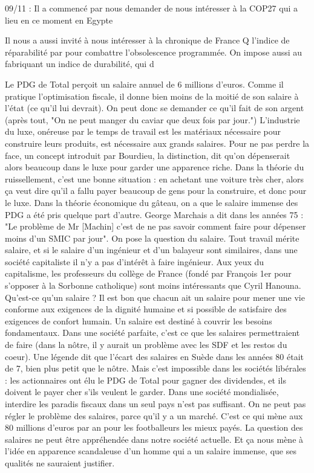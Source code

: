 \documentclass[a4paper,12pt]{book}
\begin{document}
\par 09/11 : Il a commencé par nous demander de nous intéresser à la COP27 qui a lieu en ce moment en Egypte
\par Il nous a aussi invité à nous intéresser à la chronique de France Q l'indice de réparabilité par pour combattre l'obsolescence programmée. On impose aussi au fabriquant un indice de durabilité, qui d
\par Le PDG de Total perçoit un salaire annuel de 6 millions d'euros. Comme il pratique l'optimisation fiscale, il donne bien moins de la moitié de son salaire à l'état (ce qu'il lui devrait). On peut donc se demander ce qu'il fait de son argent (après tout, "On ne peut manger du caviar que deux fois par jour.") L'industrie du luxe, onéreuse par le temps de travail est les matériaux nécessaire pour construire leurs produits, est nécessaire aux grands salaires. Pour ne pas perdre la face, un concept introduit par Bourdieu, la distinction, dit qu'on dépenserait alors beaucoup dans le luxe pour garder une apparence riche. Dans la théorie du ruissellement, c'est une bonne situation : en achetant une voiture très cher, alors ça veut dire qu'il a fallu payer beaucoup de gens pour la construire, et donc pour le luxe. Dans la théorie économique du gâteau, on a que le salaire immense des PDG a été pris quelque part d'autre. George Marchais a dit dans les années 75 : "Le problème de Mr [Machin] c'est de ne pas savoir comment faire pour dépenser moins d'un SMIC par jour". On pose la question du salaire. Tout travail mérite salaire, et si le salaire d'un ingénieur et d'un balayeur sont similaires, dans une société capitaliste il n'y a pas d'intérêt à faire ingénieur. Aux yeux du capitalisme, les professeurs du collège de France (fondé par François 1er pour s'opposer à la Sorbonne catholique) sont moins intéressants que Cyril Hanouna. Qu'est-ce qu'un salaire ? Il est bon que chacun ait un salaire pour mener une vie conforme aux exigences de la dignité humaine et si possible de satisfaire des exigences de confort humain. Un salaire est destiné à couvrir les besoins fondamentaux. Dans une société parfaite, c'est ce que les salaires permettraient de faire (dans la nôtre, il y aurait un problème avec les SDF et les restos du coeur). Une légende dit que l'écart des salaires en Suède dans les années 80 était de 7, bien plus petit que le nôtre. Mais c'est impossible dans les sociétés libérales : les actionnaires ont élu le PDG de Total pour gagner des dividendes, et ils doivent le payer cher s'ils veulent le garder. Dans une société mondialisée, interdire les paradis fiscaux dans un seul pays n'est pas suffisant. On ne peut pas régler le problème des salaires, parce qu'il y a un marché. C'est ce qui mène aux 80 millions d'euros par an pour les footballeurs les mieux payés. La question des salaires ne peut être appréhendée dans notre société actuelle. Et ça nous mène à l'idée en apparence scandaleuse d'un homme qui a un salaire immense, que ses qualités ne sauraient justifier.
\end{document}
